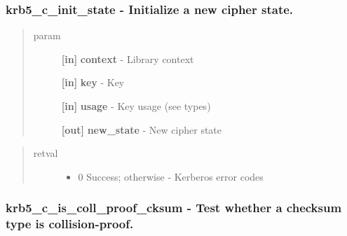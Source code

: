 \documentclass[letterpaper,10pt,english]{sphinxmanual}
\begin{document}
\subsubsection{krb5\_c\_init\_state -  Initialize a new cipher state.}
\label{appdev/refs/api/krb5_c_init_state:krb5-c-init-state-initialize-a-new-cipher-state}\label{appdev/refs/api/krb5_c_init_state::doc}

\begin{fulllineitems}
\label{appdev/refs/api/krb5_c_init_state:krb5_c_init_state}
\end{fulllineitems}

\begin{quote}\begin{description}
\item[{param}] \leavevmode
\textbf{{[}in{]}} \textbf{context} - Library context

\textbf{{[}in{]}} \textbf{key} - Key

\textbf{{[}in{]}} \textbf{usage} - Key usage (see  types)

\textbf{{[}out{]}} \textbf{new\_state} - New cipher state

\end{description}\end{quote}
\begin{quote}\begin{description}
\item[{retval}] \leavevmode\begin{itemize}
\item {} 
0   Success; otherwise - Kerberos error codes

\end{itemize}

\end{description}\end{quote}


\subsubsection{krb5\_c\_is\_coll\_proof\_cksum -  Test whether a checksum type is collision-proof.}
\label{appdev/refs/api/krb5_c_is_coll_proof_cksum:krb5-c-is-coll-proof-cksum-test-whether-a-checksum-type-is-collision-proof}\label{appdev/refs/api/krb5_c_is_coll_proof_cksum::doc}
\end{document}
